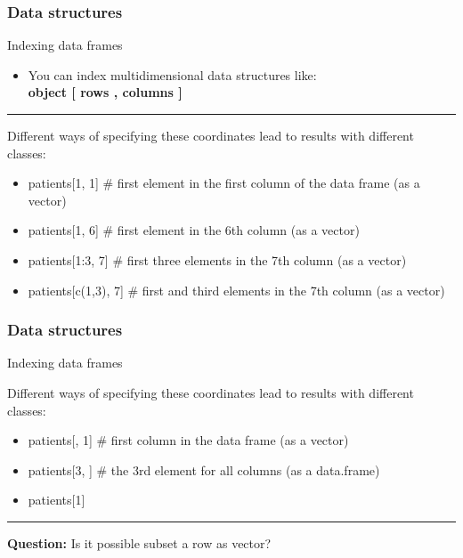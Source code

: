 \documentclass{beamer}
\begin{document}
\begin{frame}[fragile]
	\frametitle{Data structures}
	\centering \LARGE Indexing data frames 
	\begin{itemize}
		\small
		\item You can index multidimensional data structures like:\\ \Large \textbf{object [ rows , columns ]}
	\end{itemize}
	\normalsize \raggedright
	\pause
\rule{\textwidth}{0.4pt}
	Different ways of specifying these coordinates lead to results with different classes:
	\begin{itemize}
			\normalsize
		\item patients[1, 1] {\scriptsize \# first element in the first column of the data frame (as a vector)}
		\item patients[1, 6]   {\scriptsize \# first element in the 6th column (as a vector)}
		\item patients[1:3, 7] {\scriptsize \# first three elements in the 7th column (as a vector)}
		\item patients[c(1,3), 7] {\scriptsize \# first and third elements in the 7th column (as a vector)}
	\end{itemize}
\end{frame}

\begin{frame}[fragile]
	\frametitle{Data structures}
	\centering \LARGE Indexing data frames\\
	\normalsize \raggedright
		Different ways of specifying these coordinates lead to results with different classes:
	\begin{itemize}
		\item patients[, 1] {\scriptsize \# first column in the data frame (as a vector)}
		\item patients[3, ] {\scriptsize \# the 3rd element for all columns (as a data.frame)}
\pause
		\item patients[1] 
	\end{itemize}
\rule{\textwidth}{0.4pt}

	\textbf{ Question:} Is it possible subset a row as vector?
\end{frame}
\end{document}
